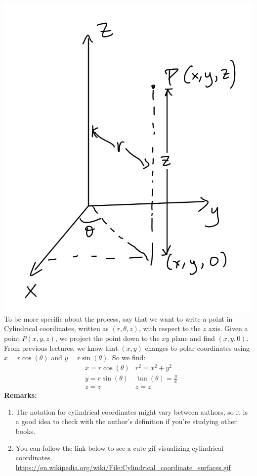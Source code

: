 \documentclass[12pt]{article}
\begin{document}
\includegraphics[scale=.2]{cylindrical.jpeg}
To be more specific about the process, say that we want to write a point in Cylindrical coordinates, written as $(r,\theta,z)$, with respect to the $z$ axis. Given a point $P(x,y,z)$, we project the point down to the $xy$ plane and find $(x,y,0)$. From previous lectures, we know that $(x,y)$ changes to polar coordinates using $x=r\cos(\theta) $ and $y=r\sin(\theta)$. So we find:
\begin{align*}
&x=r\cos(\theta) & r^2=x^2+y^2\\
&y=r\sin(\theta) & \tan(\theta)=\frac{y}{x}\\
&z=z & z=z
\end{align*}
\textbf{Remarks:} 
\begin{enumerate}
\item The notation for cylindrical coordinates might vary between authors, so it is a good idea to check with the author's definition if you're studying other books.
\item You can follow the link below to see a cute gif visualizing cylindrical coordinates. \url{https://en.wikipedia.org/wiki/File:Cylindrical_coordinate_surfaces.gif}
\end{enumerate}
\end{document}
